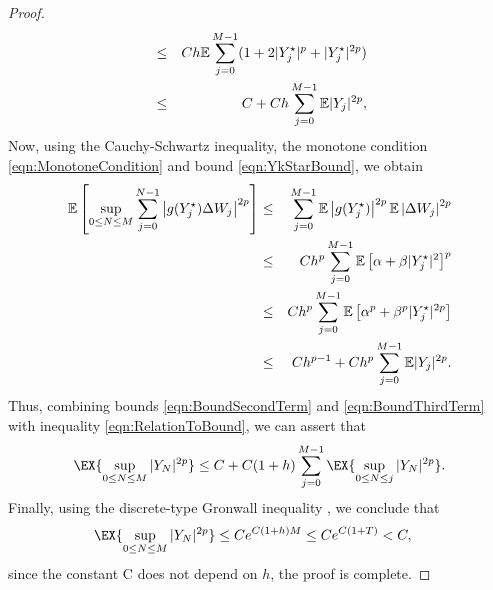 \begin{proof}
\begin{eqnarray}
&\leq&
C h
\mathbb{E}\sum_{j=0}^{M-1}
(1+2|Y_j^{\star}|^p + |Y_j^{\star}|^{2p})
\notag\\
&\leq&
C 
+ 
C h 
\sum_{j=0}^{M-1}
\mathbb{E}|Y_j|^{2p},				
\end{eqnarray}
Now, using the Cauchy-Schwartz inequality, the monotone condition 
\eqref{eqn:MonotoneCondition} and bound \eqref{eqn:YkStarBound}, we obtain
\begin{eqnarray}
\m\left[
\sup_{0\leq N \leq M}
\sum_{j=0}^{N-1}
\left|
g(Y_j^{\star})\Delta W_j
\right|^{2p}	
\right]
&\leq&	
\sum_{j=0}^{M-1}
\m
\left|
g(Y_j^{\star})
\right|^{2p}
\m
\left|
\Delta W_j
\right|^{2p}
\notag \\
&\leq&
C h^p
\sum_{j=0}^{M-1}
\m
\left[
\alpha +\beta|Y^{\star}_j|^2
\right]^p
\notag\\
%
&\leq&
Ch^p
\sum_{j=0}^{M-1}
\m
\left[
\alpha ^p +\beta^p |Y^{\star}_j|^{2p}
\right]
\notag\\
&\leq&
Ch^{p-1}
+
Ch^p \sum_{j=0}^{M-1}
\m|Y_j|^{2p} \label{eqn:BoundThirdTerm}.
\end{eqnarray}
Thus, combining bounds \eqref{eqn:BoundSecondTerm} and \eqref{eqn:BoundThirdTerm} with inequality 
\eqref{eqn:RelationToBound}, we can assert that
\begin{align}
	\EX{
		\sup_{0\leq N \leq M}
		|Y_N|^{2p} 
	}
	\leq	
	C +C(1+h) 
	\sum_{j=0}^{M-1}
	\EX{
		\sup_{0\leq N \leq j}
		|Y_N|^{2p}
	}	
	.
\end{align}
Finally, using the discrete-type Gronwall inequality \cite{Mao2007}, we conclude that
\begin{align*}
	\EX{
		\sup_{0\leq N \leq M}
		|Y_N|^{2p} 
	}	
	&\leq
	C e^{C(1+h)M} 
	\leq 
	C e^{C(1+T)}<C,
\end{align*}
since the constant C does not depend on $h$, the proof is complete.
\end{proof}

	

